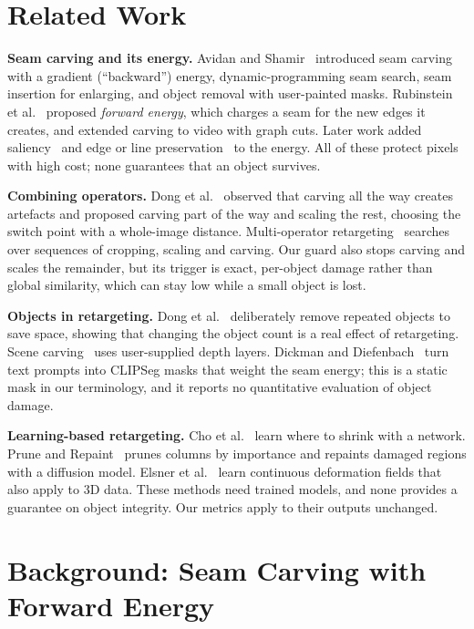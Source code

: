 \documentclass[conference]{IEEEtran}
\begin{document}
\section{Related Work}

\textbf{Seam carving and its energy.} Avidan and Shamir~\cite{avidan2007seam} introduced seam carving with a gradient (``backward'') energy, dynamic-programming seam search, seam insertion for enlarging, and object removal with user-painted masks. Rubinstein et al.~\cite{rubinstein2008improved} proposed \emph{forward energy}, which charges a seam for the new edges it creates, and extended carving to video with graph cuts. Later work added saliency~\cite{achanta2009saliency} and edge or line preservation~\cite{kiess2010edge} to the energy. All of these protect pixels with high cost; none guarantees that an object survives.

\textbf{Combining operators.} Dong et al.~\cite{dong2009optimized} observed that carving all the way creates artefacts and proposed carving part of the way and scaling the rest, choosing the switch point with a whole-image distance. Multi-operator retargeting~\cite{rubinstein2009multiop} searches over sequences of cropping, scaling and carving. Our guard also stops carving and scales the remainder, but its trigger is exact, per-object damage rather than global similarity, which can stay low while a small object is lost.

\textbf{Objects in retargeting.} Dong et al.~\cite{dong2014summarization} deliberately remove repeated objects to save space, showing that changing the object count is a real effect of retargeting. Scene carving~\cite{mansfield2010scene} uses user-supplied depth layers. Dickman and Diefenbach~\cite{dickman2024directorial} turn text prompts into CLIPSeg masks that weight the seam energy; this is a static mask in our terminology, and it reports no quantitative evaluation of object damage.

\textbf{Learning-based retargeting.} Cho et al.~\cite{cho2017weakly} learn where to shrink with a network. Prune and Repaint~\cite{shen2024prune} prunes columns by importance and repaints damaged regions with a diffusion model. Elsner et al.~\cite{elsner2024deformation} learn continuous deformation fields that also apply to 3D data. These methods need trained models, and none provides a guarantee on object integrity. Our metrics apply to their outputs unchanged.

\section{Background: Seam Carving with Forward Energy}
\end{document}

